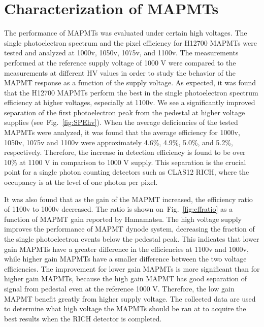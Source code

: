 \section{Characterization of MAPMTs}
The performance of MAPMTs was evaluated under certain high voltages.
The single photoelectron spectrum and the pixel efficiency for H12700 MAPMTs were tested and analyzed at 1000v, 1050v, 1075v, and 1100v.
The measurements performed at the reference supply voltage of 1000 V were compared to the measurements at different HV values in order to study the behavior of the MAPMT response as a function of the supply voltage.
As expected, it was found that the H12700 MAPMTs perform the best in the single photoelectron spectrum efficiency at higher voltages, especially at 1100v.
We see a significantly improved separation of the first photoelectron peak from the pedestal at higher voltage supplies (see~Fig.~\ref{fig:SPEhv}).
When the average deficiencies of the tested MAPMTs were analyzed, it was found that the average efficiency for 1000v, 1050v, 1075v and 1100v were approximately 4.6\%, 4.9\%, 5.0\%, and 5.2\%, respectively.
Therefore, the increase in detection efficiency is found to be over 10\% at 1100 V in comparison to 1000 V supply.
This separation is the crucial point for a single photon counting detectors such as CLAS12 RICH, where the occupancy is at the level of one photon per pixel.



It was also found that as the gain of the MAPMT increased, the efficiency ratio of 1100v to 1000v decreased.
The ratio is shown on~Fig.~\ref{fig:effratio} as a function of MAPMT gain reported by Hamamatsu.
The high voltage supply improves the performance of MAPMT dynode system, decreasing the fraction of the single photoelectron events below the pedestal peak.
This indicates that lower gain MAPMTs have a greater difference in the efficiencies at 1100v and 1000v, while higher gain MAPMTs have a smaller difference between the two voltage efficiencies.
The improvement for lower gain MAPMTs is more significant than for higher gain MAPMTs, because the high gain MAPMT has good separation of signal from pedestal even at the reference 1000 V.
Therefore, the low gain MAPMT benefit greatly from higher supply voltage.
The collected data are used to determine what high voltage the MAPMTs should be ran at to acquire the best results when the RICH detector is completed.


